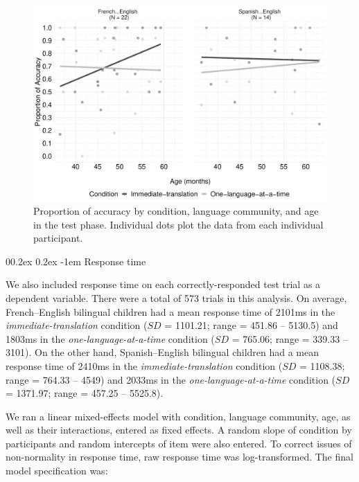 \documentclass[
  man,floatsintext]{apa7}
\makeatletter
\let\oldparagraph\paragraph
\renewcommand{\paragraph}[1]{\oldparagraph{#1}\mbox{}}
\renewcommand{\paragraph}{\@startsection{paragraph}{4}{\parindent}%
  {0\baselineskip \@plus 0.2ex \@minus 0.2ex}%
  {-1em}%
  {\normalfont\normalsize\bfseries\itshape\typesectitle}}
\renewcommand{\paragraph}{\@startsection{paragraph}{4}{\parindent}%
  {0\baselineskip \@plus 0.2ex \@minus 0.2ex}%
  {-1em}%
  {\normalfont\normalsize\bfseries\typesectitle}}
\makeatother
\begin{document}
\begin{figure}

{\centering \includegraphics[width=0.9\linewidth]{TabletSwitch_supplemental_files/figure-latex/FigureS4-1} 

}

\caption{Proportion of accuracy by condition, language community, and age in the test phase. Individual dots plot the data from each individual participant.}\label{fig:FigureS4}
\end{figure}

\hypertarget{response-time-1}{%
\paragraph{Response time}\label{response-time-1}}

We also included response time on each correctly-responded test trial as a dependent variable. There were a total of 573 trials in this analysis. On average, French--English bilingual children had a mean response time of 2101ms in the \emph{immediate-translation} condition (\(SD\) = 1101.21; range = 451.86 -- 5130.5) and 1803ms in the \emph{one-language-at-a-time} condition (\(SD\) = 765.06; range = 339.33 -- 3101). On the other hand, Spanish--English bilingual children had a mean response time of 2410ms in the \emph{immediate-translation} condition (\(SD\) = 1108.38; range = 764.33 -- 4549) and 2033ms in the \emph{one-language-at-a-time} condition (\(SD\) = 1371.97; range = 457.25 -- 5525.8).

We ran a linear mixed-effects model with condition, language community, age, as well as their interactions, entered as fixed effects. A random slope of condition by participants and random intercepts of item were also entered. To correct issues of non-normality in response time, raw response time was log-transformed. The final model specification was:
\end{document}
